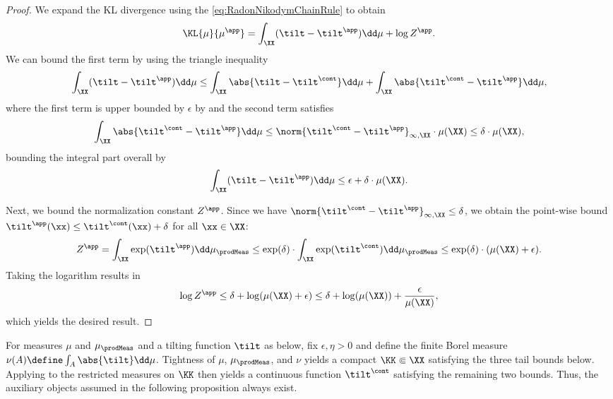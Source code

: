 \documentclass{article}
\begin{document}
\begin{proof}
 We expand the KL divergence using the \eqref{eq:RadonNikodymChainRule} to obtain
 \begin{align*}
  \KL{\mu}{\mu^\app} = \int_{\XX} (\tilt - \tilt^\app) \dd \mu + \log Z^\app.
 \end{align*}
 We can bound the first term by using the triangle inequality
 \begin{align*}
  \int_{\XX} (\tilt - \tilt^\app) \dd \mu \leq \int_{\XX} \abs{\tilt - \tilt^\cont} \dd \mu
  + \int_{\XX} \abs{\tilt^\cont - \tilt^\app} \dd \mu,
 \end{align*}
 where the first term is upper bounded by $\epsilon$ by 
 and the second term satisfies
 \begin{align*}
  \int_{\XX} \abs{\tilt^\cont - \tilt^\app} \dd \mu
  \leq \norm{\tilt^\cont - \tilt^\app}_{\infty, \XX} \cdot \mu(\XX)
  \le \delta \cdot \mu(\XX),
 \end{align*}
 bounding the integral part overall by
 \begin{align*}
  \int_{\XX} (\tilt - \tilt^\app) \dd \mu  \leq \epsilon + \delta \cdot \mu(\XX).
 \end{align*}

 Next, we bound the normalization constant $Z^\app$. Since we have
 $\norm{\tilt^\cont - \tilt^\app}_{\infty, \XX} \leq \delta$, we obtain the
 point-wise bound $\tilt^\app(\xx) \leq \tilt^\cont(\xx) + \delta$ for all
 $\xx \in \XX$:
 \begin{align*}
  Z^\app = \int_{\XX} \exp(\tilt^\app) \dd\mu_\prodMeas
  \leq \exp(\delta) \cdot \int_{\XX} \exp(\tilt^\cont) \dd \mu_\prodMeas
  \leq \exp(\delta) \cdot (\mu(\XX) + \epsilon).
 \end{align*}
 Taking the logarithm results in
 \begin{align*}
  \log Z^\app \leq \delta + \log(\mu(\XX) +\epsilon)
  \leq \delta + \log(\mu(\XX)) + \frac{\epsilon}{\mu(\XX)},
 \end{align*}
 which yields the desired result.
\end{proof}

 For measures $\mu$ and $\mu_\prodMeas$ and a tilting function $\tilt$
 as below, fix $\epsilon,\eta>0$ and define the finite Borel measure
 $\nu(A)\define\int_A\abs{\tilt}\dd\mu$. Tightness of $\mu$,
 $\mu_\prodMeas$, and $\nu$ yields a compact $\KK\Subset\XX$ satisfying the
 three tail bounds below. Applying  to the
 restricted measures on $\KK$ then yields a continuous function
 $\tilt^\cont$ satisfying the remaining two bounds. Thus, the auxiliary
 objects assumed in the following proposition always exist.
\end{document}

